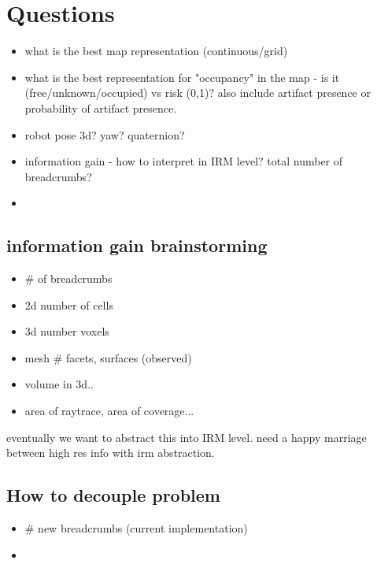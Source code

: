 \documentclass[letterpaper, 10 pt, conference]{ieeeconf}  %
\begin{document}
\section{Questions}
\begin{itemize}
    \item what is the best map representation (continuous/grid)
    \item what is the best representation for "occupancy" in the map - is it (free/unknown/occupied) vs risk (0,1)?  also include artifact presence or probability of artifact presence.
    \item robot pose 3d? yaw?  quaternion?
    \item information gain - how to interpret in IRM level?  total number of breadcrumbs?
    \item 
\end{itemize}

\subsection{information gain brainstorming}
\begin{itemize}
    \item \# of breadcrumbs
    \item 2d number of cells
    \item 3d number voxels
    \item mesh \# facets, surfaces (observed)
    \item volume in 3d..
    \item area of raytrace, area of coverage...
\end{itemize}
eventually we want to abstract this into IRM level.  need a happy marriage between high res info with irm abstraction.\\

\subsection{How to decouple problem}
\begin{itemize}
    \item \# new breadcrumbs (current implementation)
    \item 
\end{itemize}
\end{document}
